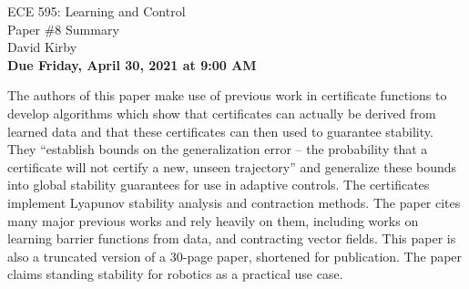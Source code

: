 \documentclass[11pt]{article}
\begin{document}
\begin{center}
\LARGE{ECE 595: Learning and Control\\Paper \#8 Summary}\\[1.5em]
\large David Kirby\\[1.5em]
\large \textbf{Due Friday, April 30, 2021 at 9:00 AM}\\[2.5em]
\end{center}

\noindent The authors of this paper make use of previous work in certificate functions to develop algorithms which show that certificates can actually be derived from learned data and that these certificates can then used to guarantee stability. They ``establish bounds on the generalization error -- the probability that a certificate will not certify a new, unseen trajectory'' and generalize these bounds into global stability guarantees for use in adaptive controls. The certificates implement Lyapunov stability analysis and contraction methods. The paper cites many major previous works and rely heavily on them, including works on learning barrier functions from data, and contracting vector fields. This paper is also a truncated version of a 30-page paper, shortened for publication. The paper claims standing stability for robotics as a practical use case.
\end{document}
